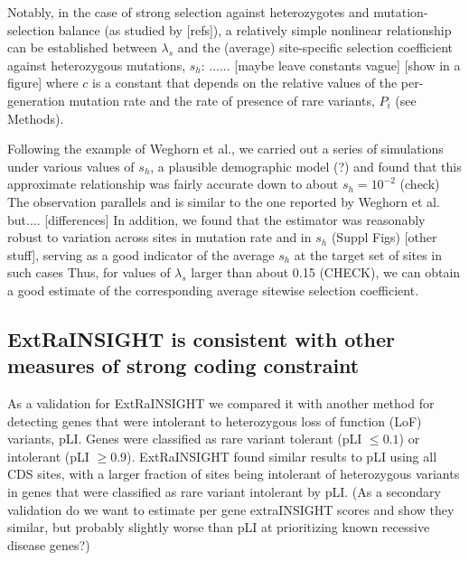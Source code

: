 \documentclass[11pt]{article}
\begin{document}
Notably, in the case of strong selection against heterozygotes and mutation-selection balance (as studied by [refs]),
a relatively simple nonlinear relationship can be established between $\lambda_s$ and the (average) site-specific selection coefficient against heterozygous mutations, $s_h$:    ......     [maybe leave constants vague]     [show in a figure]
where $c$ is a constant that depends on the relative values of the per-generation mutation rate and the rate of presence of rare variants, $P_i$ (see Methods).

Following the example of Weghorn et al., we carried out a series of simulations 
under various values of $s_h$, 
a plausible demographic model (?)
and found that this approximate relationship was fairly accurate down to about $s_h = 10^{-2}$ (check)
The observation parallels and is similar to the one reported by Weghorn et al. but.... [differences]
In addition, we  found that the estimator was reasonably robust to variation across sites in mutation rate and in $s_h$ (Suppl Figs)   [other stuff], serving as a good indicator of the average $s_h$ at the target set of sites in such cases
Thus, for values of $\lambda_s$ larger than about 0.15 (CHECK), we can obtain a good estimate of the corresponding average sitewise selection coefficient.

\subsection*{ExtRaINSIGHT is consistent with other measures of strong coding constraint}
As a validation for ExtRaINSIGHT we compared it with another method for detecting genes that were intolerant to heterozygous loss of function (LoF) variants, pLI. Genes were classified as rare variant tolerant (pLI $\leq 0.1$) or intolerant (pLI $\geq 0.9$). ExtRaINSIGHT found similar results to pLI using all CDS sites, with a larger fraction of sites being intolerant of heterozygous variants in genes that were classified as rare variant intolerant by pLI.  (As a secondary validation do we want to estimate per gene extraINSIGHT scores and show they similar, but probably slightly worse than pLI at prioritizing known recessive disease genes?) 
\end{document}
